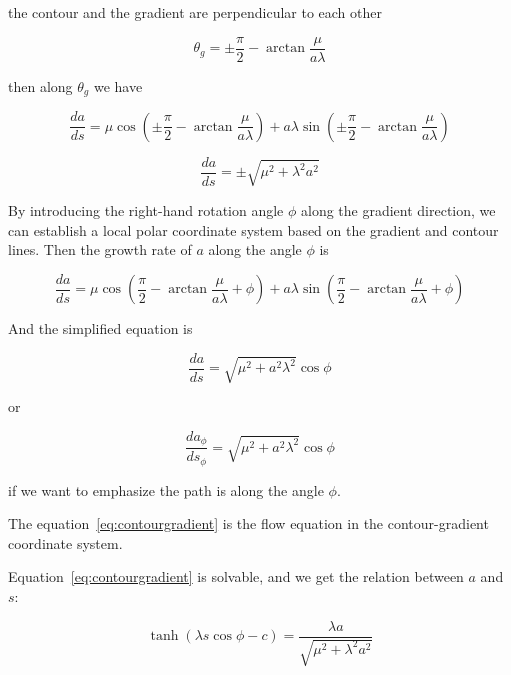 the contour and the gradient are perpendicular to each other

\begin{equation}
    \theta_g = \pm \frac{\pi}{2} - \arctan \frac{\mu}{a \lambda}\label{eq:gradientangle}
\end{equation}

then along $\theta_g$ we have

\begin{equation}
    \frac{da}{ds} = \mu \cos (\pm \frac{\pi}{2} - \arctan \frac{\mu}{a \lambda}) + a \lambda \sin (\pm \frac{\pi}{2} - \arctan \frac{\mu}{a \lambda})
    \label{eq:alonggradient}
\end{equation}

\begin{equation}
    \frac{da}{ds} = \pm \sqrt{\mu^2 + \lambda^2 a^2}\label{eq:grad}
\end{equation}

By introducing the right-hand rotation angle $\phi$ along the gradient direction, we can establish a local polar coordinate system based on the gradient and contour lines.
Then the growth rate of $a$ along the angle $\phi$ is

\begin{equation}
    \frac{da}{ds} = \mu \cos (\frac{\pi}{2} - \arctan \frac{\mu}{a \lambda} + \phi) + a \lambda \sin (\frac{\pi}{2} - \arctan \frac{\mu}{a \lambda} + \phi)
    \label{eq:fourfold}
\end{equation}

And the simplified equation is

\begin{equation}
    \frac{da}{ds} = \sqrt {\mu^2 + a^2 \lambda^2} \cos \phi\label{eq:contourgradient}
\end{equation}

or

\begin{equation}
    \frac{da_{\phi}}{ds_{\phi}} = \sqrt {\mu^2 + a^2 \lambda^2} \cos \phi\label{eq:contourgradient2}
\end{equation}

if we want to emphasize the path is along the angle $\phi$.

The equation~\eqref{eq:contourgradient} is the flow equation in the contour-gradient coordinate system.

Equation~\eqref{eq:contourgradient} is solvable, and we get the relation between $a$ and $s$:

\begin{equation}\label{eq:rel_a_s}
    \tanh(\lambda s \cos \phi - c) = \frac{\lambda a}{\sqrt{\mu^2 + \lambda^2 a^2}}
\end{equation}


